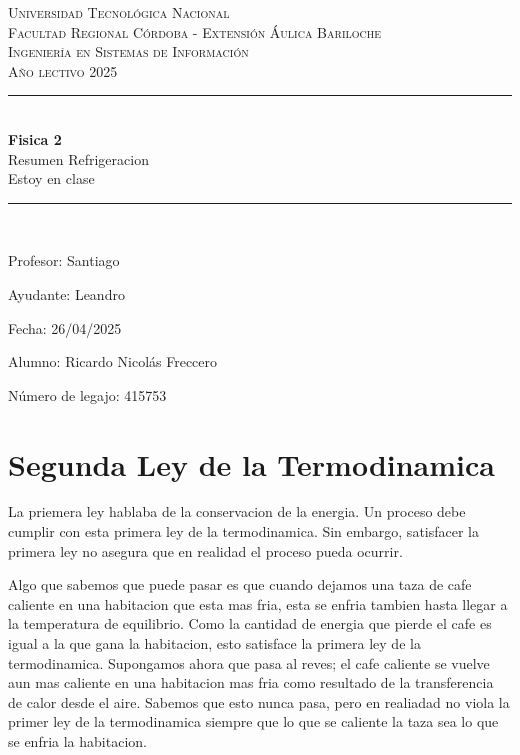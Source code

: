 \documentclass[12pt]{article}
\begin{document}
  \begin{titlepage}
    \centering

    \textsc{
      \LARGE Universidad Tecnológica Nacional\\
      \Large Facultad Regional Córdoba - Extensión Áulica Bariloche\\
      \large Ingeniería en Sistemas de Información\\
      Año lectivo 2025\\[0.5cm]
    }

    \rule{\linewidth}{1.0mm}\\[0.4cm]
    \Huge
    \textbf{Fisica 2}\\
    Resumen Refrigeracion\\[0.2cm]
    \LARGE
    Estoy en clase
    \rule{\linewidth}{1.0mm}\\
    \large
    \begin{flushleft}
      Profesor: Santiago

      Ayudante: Leandro

      Fecha: 26/04/2025
    \end{flushleft}

    \vfill
    \begin{flushright}
      Alumno: Ricardo Nicolás Freccero  

      Número de legajo: 415753
    \end{flushright}
  \end{titlepage}
  
  \restoregeometry
  \tableofcontents
  \newpage

  \section{Segunda Ley de la Termodinamica}
  La priemera ley hablaba de la conservacion de la energia. Un proceso debe cumplir con esta primera ley de la termodinamica. Sin embargo, satisfacer la primera ley no asegura que en realidad el proceso pueda ocurrir.

  Algo que  sabemos que puede pasar es que cuando dejamos una taza de cafe caliente en una habitacion que esta mas fria, esta se enfria tambien hasta llegar a la temperatura de equilibrio. Como la cantidad de energia que pierde el cafe es igual a la que gana la habitacion, esto satisface la primera ley de la termodinamica. Supongamos ahora que pasa al reves; el cafe caliente se vuelve aun mas caliente en una habitacion mas fria como resultado de la transferencia de calor desde el aire. Sabemos que esto nunca pasa, pero en realiadad no viola la primer ley de la termodinamica siempre que lo que se caliente la taza sea lo que se enfria la habitacion.
\end{document}
